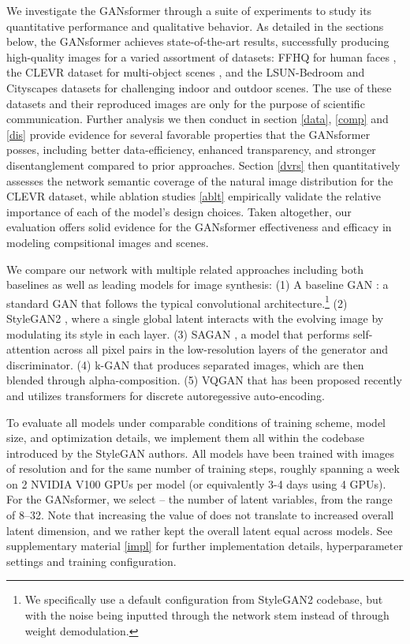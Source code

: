 \documentclass{article}
\begin{document}
We investigate the GANsformer through a suite of experiments to study its quantitative performance and qualitative behavior. As detailed in the sections below, the GANsformer achieves state-of-the-art results, successfully producing high-quality images for a varied assortment of datasets: FFHQ for human faces \citep{stylegan}, the CLEVR dataset for multi-object scenes \citep{clevr}, and the LSUN-Bedroom \citep{lsun} and Cityscapes \citep{cityscapes} datasets for challenging indoor and outdoor scenes. The use of these datasets and their reproduced images are only for the purpose of scientific communication. Further analysis we then conduct in section \ref{data}, \ref{comp} and \ref{dis} provide evidence for several favorable properties that the GANsformer posses, including better data-efficiency, enhanced transparency, and stronger disentanglement compared to prior approaches. Section \ref{dvrs} then quantitatively assesses the network semantic coverage of the natural image distribution for the CLEVR dataset, while ablation studies \ref{ablt} empirically validate the relative importance of each of the model's design choices. Taken altogether, our evaluation offers solid evidence for the GANsformer effectiveness and efficacy in modeling compsitional images and scenes.

We compare our network with multiple related approaches including both baselines as well as leading models for image synthesis: (1) A baseline GAN \citep{gan}: a standard GAN that follows the typical convolutional architecture.\footnote{We specifically use a default configuration from StyleGAN2 codebase, but with the noise being inputted through the network stem instead of through weight demodulation.} (2) StyleGAN2 \citep{stylegan2}, where a single global latent interacts with the evolving image by modulating its style in each layer. (3) SAGAN \citep{sagan}, a model that performs self-attention across all pixel pairs in the low-resolution layers of the generator and discriminator. (4) k-GAN \citep{kgan} that produces  separated images, which are then blended through alpha-composition. (5) VQGAN \citep{taming} that has been proposed recently and utilizes transformers for discrete autoregessive auto-encoding.

To evaluate all models under comparable conditions of training scheme, model size, and optimization details, we implement them all within the codebase introduced by the StyleGAN authors. All models have been trained with images of  resolution and for the same number of training steps, roughly spanning a week on 2 NVIDIA V100 GPUs per model (or equivalently 3-4 days using 4 GPUs). For the GANsformer, we select  -- the number of latent variables, from the range of 8--32. Note that increasing the value of  does not translate to increased overall latent dimension, and we rather kept the overall latent equal across models. See supplementary material \ref{impl} for further implementation details, hyperparameter settings and training configuration. 
\end{document}
